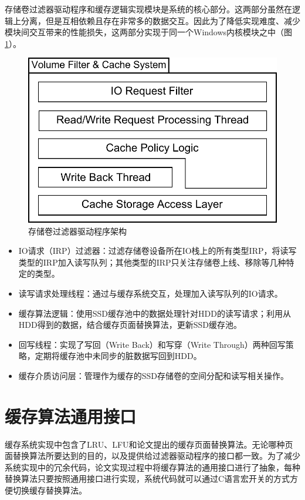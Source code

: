 存储卷过滤器驱动程序和缓存逻辑实现模块是系统的核心部分。这两部分虽然在逻辑上分离，但是互相依赖且存在非常多的数据交互。因此为了降低实现难度、减少模块间交互带来的性能损失，这两部分实现于同一个Windows内核模块之中（图\ref{fig:sys-flt-arch}）。

\begin{figure}[!ht]
\centering
\includegraphics[width=0.6\linewidth]{./graph/sys-flt-arch}
\caption{存储卷过滤器驱动程序架构}
\label{fig:sys-flt-arch}
\end{figure}

\begin{itemize}
\item
IO请求（IRP）过滤器：过滤存储卷设备所在IO栈上的所有类型IRP，将读写类型的IRP加入读写队列；其他类型的IRP只关注存储卷上线、移除等几种特定的类型。
\item
读写请求处理线程：通过与缓存系统交互，处理加入读写队列的IO请求。
\item
缓存算法逻辑：使用SSD缓存池中的数据处理针对HDD的读写请求；利用从HDD得到的数据，结合缓存页面替换算法，更新SSD缓存池。
\item
回写线程：实现了写回（Write Back）和写穿（Write Through）两种回写策略，定期将缓存池中未同步的脏数据写回到HDD。
\item
缓存介质访问层：管理作为缓存的SSD存储卷的空间分配和读写相关操作。
\end{itemize}


\section{缓存算法通用接口}
\label{sec:cache_interface}

缓存系统实现中包含了LRU、LFU和论文提出的缓存页面替换算法。无论哪种页面替换算法所要达到的目的，以及提供给过滤器驱动程序的接口都一致。为了减少系统实现中的冗余代码，论文实现过程中将缓存算法的通用接口进行了抽象，每种替换算法只要按照通用接口进行实现，系统代码就可以通过C语言宏开关的方式方便切换缓存替换算法。

